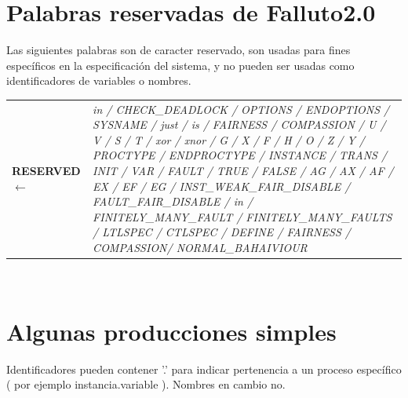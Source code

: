 \documentclass[titlepage, 12pt]{book}
\begin{document}
\section{Palabras reservadas de Falluto2.0}

Las siguientes palabras son de caracter reservado, son usadas para fines espec\'ificos en la especificaci\'on del sistema, y no pueden ser usadas como identificadores de variables o nombres.\\

\begin{tabularx}{\textwidth}{>{\bfseries}l>{\itshape}X }

RESERVED $\longleftarrow$ & in / CHECK\_DEADLOCK / OPTIONS / ENDOPTIONS / SYSNAME / just / is / FAIRNESS / COMPASSION / U / V / S / T / xor / xnor / G / X / F / H / O / Z / Y / PROCTYPE / ENDPROCTYPE / INSTANCE / TRANS / INIT / VAR / FAULT / TRUE / FALSE / AG / AX / AF / EX / EF / EG / INST\_WEAK\_FAIR\_DISABLE / FAULT\_FAIR\_DISABLE / in / FINITELY\_MANY\_FAULT / FINITELY\_MANY\_FAULTS / LTLSPEC / CTLSPEC / DEFINE / FAIRNESS / COMPASSION/ NORMAL\_BAHAIVIOUR\\
\end{tabularx}
~\\



\section{Algunas producciones simples}

Identificadores pueden contener '.' para indicar pertenencia a un proceso espec\'ifico ( por ejemplo instancia.variable ). Nombres en cambio no.\\
\end{document}
